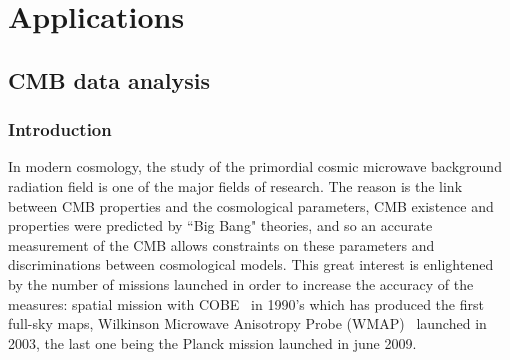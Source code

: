 

\section{Applications}

\subsection{CMB data analysis}
\label{sect:NUMEXP}


\subsubsection{Introduction}
In modern cosmology, the study of the primordial cosmic microwave background radiation field is one of the major fields of research. 
The reason is the link between CMB properties and the cosmological parameters, CMB existence and properties were predicted by ``Big Bang" theories, and so an 
accurate measurement of the CMB allows constraints on these parameters and discriminations between cosmological models. This great interest is enlightened by 
the number of missions launched in order to increase the accuracy of the measures: spatial mission with COBE~\citep{gauss:smoot92,gauss:kunz01,astro:rocha04} 
in 1990's which has produced the first full-sky maps, Wilkinson Microwave Anisotropy Probe (WMAP)~\citep{astro:bennett2003,astro:2005MNRAS.364.1185P} launched in 2003, 
the last one being the Planck mission launched in june 2009. 

